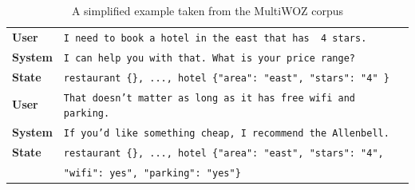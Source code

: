 \begin{table}[h]
    \centering
    \begin{tabular}{l|l}
    \toprule
         \textbf{User} & \texttt{I need to book a hotel in the {\color{cyan!80!yellow!80!black!100 }east} that has { \color{orange!50!yellow!90!black!100!}4 stars.}} \\
         \textbf{System} & \texttt{I can help you with that. What is your price range?} \\
         \textbf{State} & \texttt{restaurant \{\}, ..., hotel \{"area": "{\color{cyan!80!yellow!80!black!100 }east}", "stars": "{\color{orange!50!yellow!90!black!100!}4}" \}} \\
         \textbf{User} & \texttt{That doesn't matter as long as it has {\color{cyan!80!yellow!80!black!100 }free wifi} and {\color{orange!50!yellow!90!black!100!}parking}.}\\
         \textbf{System} & \texttt{If you'd like something cheap, I recommend the Allenbell.} \\
         \textbf{State} & \texttt{restaurant \{\}, ..., hotel \{"area": "east", "stars": "4",}\\
         & \texttt{"wifi": {\color{cyan!80!yellow!80!black!100}yes}", "parking": "{\color{orange!50!yellow!90!black!100!}yes}"\}} \\
         \bottomrule
    \end{tabular}
    \caption{A simplified example taken from the MultiWOZ corpus}
    \label{02:tab:mw_example}
\end{table}


